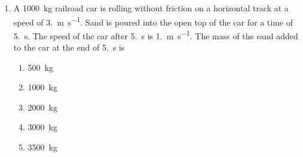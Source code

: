 \documentclass{../../oss-apphys}
\begin{document}
\begin{multicols}{2}
\begin{enumerate}[leftmargin=18pt]
%    
  \item A \SI{1000}{\kilo\gram} railroad car is rolling without friction on a
    horizontal track at a speed of \SI{3.}{\metre\per\second}. Sand is poured
    into the open top of the car for a time of \SI{5.}{\second}. The speed of
    the car after \SI{5.}{\second} is \SI{1.}{\metre\per\second}. The mass of
    the sand added to the car at the end of \SI{5.}{\second} is
    \begin{center}
    \end{center}
    \begin{enumerate}[noitemsep,topsep=0pt,leftmargin=18pt,label=(\Alph*)]
    \item\SI{500 }{\kilo\gram}
    \item\SI{1000}{\kilo\gram}
    \item\SI{2000}{\kilo\gram}
    \item\SI{3000}{\kilo\gram}
    \item\SI{3500}{\kilo\gram}
    \end{enumerate}
    \columnbreak
    

\end{enumerate}
\end{multicols}
\end{document}
